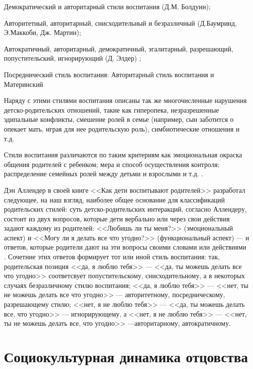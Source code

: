 \documentclass{../../common/thesisbyxetex}
\begin{document}
Демократический и авторитарный стили воспитания (Д.М. Болдуин);

Авторитетный, авторитарный, снисходительный и безразличный (Д.Баумринд, Э.Маккоби, Дж. Мартин);

Автократичный, авторитарный, демократичный, эгалитарный, разрешающий, попустительский, игнорирующий
(Д. Элдер) \cite{stil};

Посреднический стиль воспитания: Авторитарный стиль воспитания и Материнский \cite[281]{strat}

Наряду с этими стилями воспитания описаны так же многочисленные нарушения детско-родительских
отношений, такие как гиперопека,  незразрешенные эдипальные конфликты, смешение ролей в семье
(например, сын заботится о опекает мать, играя для нее родительскую роль), симбиотические отношения
и т.д.


Стили воспитания различаются по таким критериям как эмоциональная окраска общения родителей с
ребенком; мера и способ осуществления контроля; распределение семейных ролей между детьми и
взрослыми и т.д. \cite{stil}.

Дэн Аллендер в своей книге <<Как дети воспитывают родителей>> разработал следующее, на наш взгляд,
наиболее общее основание для классификаций родительских стилей: суть детско-родительских
интеракций, согласно Аллендеру, состоит из двух вопросов, которые дети вербально или
через свои действия задают каждому из родителей: <<Любишь ли ты меня?>> (эмоциональный аспект) и
<<Могу ли я делать все что угодно?>> (функциональный аспект) --- и ответов, которые родители
дают на эти вопросы своими словами или действиями \cite{den}. Сочетние этих ответов формирует тот
или иной стиль воспитания: так, родительская позиция <<да, я люблю тебя>> --- <<да, ты можешь делать
все что угодно>> соответсвует попустительскому, снисходительному, а в некоторых случаях
безразличному стилю воспитания; <<да, я люблю тебя>>  --- <<нет, ты не можешь делать все что
угодно>> --- авторитетному, посредническому, разрешающему стилю; <<нет, я не люблю тебя>> --- <<да,
ты можешь делать все, что угодно>>  --- игнорирующему, а  <<нет, я не люблю тебя>> --- <<нет, ты не
можешь делать все, что угодно>> ---авторитарному, автократичному.



 


\section{Социокультурная динамика отцовства}
\end{document}
